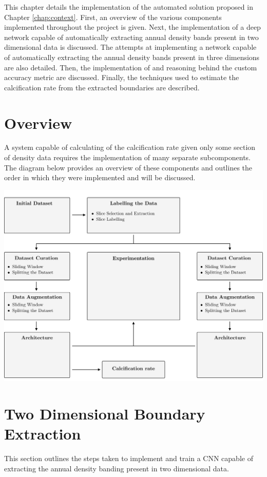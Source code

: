 This chapter details the implementation of the automated solution proposed in Chapter \ref{chap:context}. First, an overview of the various components implemented throughout the project is given. Next, the implementation of a deep network capable of automatically extracting annual density bands present in two dimensional data is discussed. The attempts at implementing a network capable of automatically extracting the annual density bands present in three dimensions are also detailed. Then, the implementation of and reasoning behind the custom accuracy metric are discussed. Finally, the techniques used to estimate the calcification rate from the extracted boundaries are described.

\section{Overview}

A system capable of calculating of the calcification rate given only some section of density data requires the implementation of many separate subcomponents. The diagram below provides an overview of these components and outlines the order in which they were implemented and will be discussed.

\includegraphics[width=\textwidth, height=0.74\textwidth]{images/overview.pdf}

\section{Two Dimensional Boundary Extraction}

This section outlines the steps taken to implement and train a CNN capable of extracting the annual density banding present in two dimensional data.

